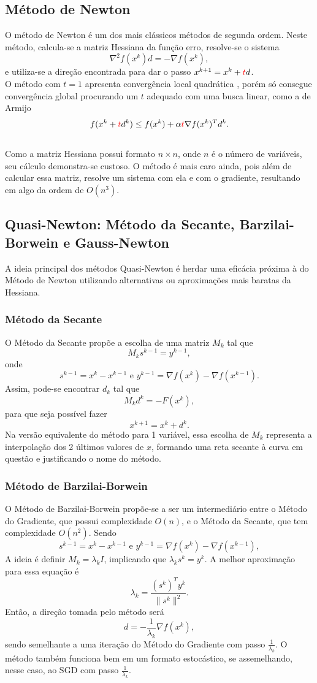 \documentclass[11pt]{article}
\begin{document}
\subsection*{Método de Newton}
O método de Newton é um dos mais clássicos métodos de segunda ordem. Neste método, calcula-se a matriz Hessiana da função erro, resolve-se o sistema  $$\nabla ^2 f(x^k)d = -\nabla f(x^k),$$ e utiliza-se a direção encontrada para dar o passo $x^{k + 1} = x^k + {\color {red}t}  d$.\\
O método com $t = 1$ apresenta convergência local quadrática  \cite{newtonJM}, porém só consegue convergência global procurando um $t$ adequado com uma busca linear, como a de Armijo  \cite{armijo1966} $$f(x^k+{\color {red}t}d^k) \leq f(x^k)+\alpha {\color {red}t} \nabla f(x^k)^T d^k.$$\\Como a matriz Hessiana possui formato $n \times n$, onde $n$ é o número de variáveis, seu cálculo demonstra-se custoso. O método é mais caro ainda, pois além de calcular essa matriz, resolve um sistema com ela e com o gradiente, resultando em algo da ordem de $O(n^3)$.

\subsection*{Quasi-Newton: Método da Secante, Barzilai-Borwein e Gauss-Newton}
A ideia principal dos métodos Quasi-Newton é herdar uma eficácia próxima à do Método de Newton utilizando alternativas ou aproximações mais baratas da Hessiana.
\subsubsection*{Método da Secante}
O Método da Secante propõe a escolha de uma matriz $M_k$ tal que   
		$$M_k s^{k-1}= y^{k-1} ,$$
		onde $$s^{k-1}=x^k-x^{k-1} \text{ e } y^{k-1}=\nabla f(x^k)- \nabla f(x^{k-1}) .$$
Assim, pode-se encontrar $d_k$ tal que
		$$M_kd^k=-F(x^k)  ,$$
		para que seja possível fazer $$x^{k+1}=x^k+d^k .$$
Na versão equivalente do método para 1 variável, essa escolha de $M_k$ representa a interpolação dos 2 últimos valores de $x$, formando uma reta secante à curva em questão e justificando o nome do método.

\subsubsection*{Método de Barzilai-Borwein}
O Método de Barzilai-Borwein propõe-se a ser um intermediário entre o Método do Gradiente, que possui complexidade $O(n)$, e o Método da Secante, que tem complexidade $O(n^2)$. Sendo 
$$s^{k-1}=x^k-x^{k-1} \text{ e } y^{k-1}=\nabla f(x^k)- \nabla f(x^{k-1}) ,$$
A ideia é definir $M_k = \lambda_k I$, implicando que $\lambda_ks^k=y^k$. A melhor aproximação para essa equação é $$\lambda_k=\frac{(s^k)^Ty^k}{\|s^k\|^2}.$$
Então, a direção tomada pelo método será $$ d = - \frac{1}{\lambda_k} \nabla f(x^k),$$
sendo semelhante a uma iteração do Método do Gradiente com passo $\frac{1}{\lambda _k}$. O método também funciona bem em um formato estocástico, se assemelhando, nesse caso, ao SGD com passo $\frac{1}{\lambda _k}$.
\end{document}
